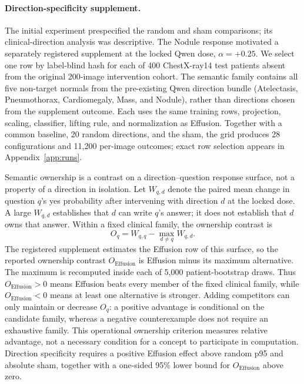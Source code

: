 \paragraph{Direction-specificity supplement.}
The initial experiment prespecified the random and sham comparisons; its clinical-direction analysis was descriptive. The Nodule response motivated a separately registered supplement at the locked Qwen dose, $\alpha=+0.25$. We select one row by label-blind hash for each of 400 ChestX-ray14 test patients absent from the original 200-image intervention cohort. The semantic family contains all five non-target normals from the pre-existing Qwen direction bundle (Atelectasis, Pneumothorax, Cardiomegaly, Mass, and Nodule), rather than directions chosen from the supplement outcome. Each uses the same training rows, projection, scaling, classifier, lifting rule, and normalization as Effusion. Together with a common baseline, 20 random directions, and the sham, the grid produces 28 configurations and 11,200 per-image outcomes; exact row selection appears in Appendix~\ref{app:runs}.

Semantic ownership is a contrast on a direction--question response surface, not a property of a direction in isolation. Let $W_{q,d}$ denote the paired mean change in question $q$'s yes probability after intervening with direction $d$ at the locked dose. A large $W_{q,d}$ establishes that $d$ can write $q$'s answer; it does not establish that $d$ owns that answer. Within a fixed clinical family, the ownership contrast is
\begin{equation}
O_q=W_{q,q}-\max_{d\neq q}W_{q,d}.
\label{eq:margin}
\end{equation}
The registered supplement estimates the Effusion row of this surface, so the reported ownership contrast $O_{\mathrm{Effusion}}$ is Effusion minus its maximum alternative. The maximum is recomputed inside each of 5,000 patient-bootstrap draws. Thus $O_{\mathrm{Effusion}}>0$ means Effusion beats every member of the fixed clinical family, while $O_{\mathrm{Effusion}}<0$ means at least one alternative is stronger. Adding competitors can only maintain or decrease $O_q$: a positive advantage is conditional on the candidate family, whereas a negative counterexample does not require an exhaustive family. This operational ownership criterion measures relative advantage, not a necessary condition for a concept to participate in computation. Direction specificity requires a positive Effusion effect above random p95 and absolute sham, together with a one-sided 95\% lower bound for $O_{\mathrm{Effusion}}$ above zero.

